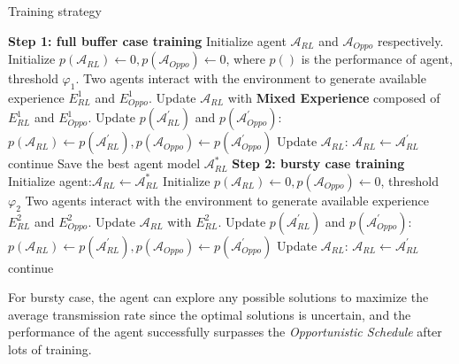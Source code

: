 \documentclass{article}
\begin{document}
\begin{algorithm}
\caption{Training strategy}
\begin{algorithmic}
\State \textbf{Step 1: full buffer case training}
\State
Initialize agent $\mathcal{A}_{RL}$ and $\mathcal{A}_{Oppo}$ respectively.
\State  
Initialize $p(\mathcal{A}_{RL}) \leftarrow 0, p(\mathcal{A}_{Oppo}) \leftarrow 0$, where $ p() $ is the performance of agent, threshold $ \varphi_{1} $.
    \State Two agents interact with the environment to generate available experience $ E_{RL}^1$ and $E_{Oppo}^1$.
    \State Update $ \mathcal{A}_{RL} $ with \textbf{Mixed Experience} composed of $ E_{RL}^1$ and $E_{Oppo}^1$.
    \EndFor
    \State Update $p(\mathcal{A}^{\prime}_{RL})$ and $p(\mathcal{A}^{\prime}_{Oppo})$:
    $
    p(\mathcal{A}_{RL}) \leftarrow p(\mathcal{A}^{\prime}_{RL}), p(\mathcal{A}_{Oppo}) \leftarrow p(\mathcal{A}^{\prime}_{Oppo})
    $
    \State Update $\mathcal{A}_{RL}$: $ \mathcal{A}_{RL} \leftarrow \mathcal{A}^{\prime}_{RL} $
    \Else
    \State continue
    \EndIf
\EndWhile
\State Save the best agent model $ \mathcal{A}^{*}_{RL} $
\State \textbf{Step 2: bursty case training}
\State
Initialize agent:$\mathcal{A}_{RL} \leftarrow \mathcal{A}^{*}_{RL}$
\State
Initialize $p(\mathcal{A}_{RL}) \leftarrow 0, p(\mathcal{A}_{Oppo}) \leftarrow 0$, threshold $ \varphi_{2} $
\State Two agents interact with the environment to generate available experience $ E_{RL}^2$ and $E_{Oppo}^2$.
\State Update $ \mathcal{A}_{RL} $ with $ E_{RL}^2$.
\State Update $p(\mathcal{A}^{\prime}_{RL})$ and $p(\mathcal{A}^{\prime}_{Oppo})$:
    $
    p(\mathcal{A}_{RL}) \leftarrow p(\mathcal{A}^{\prime}_{RL}), p(\mathcal{A}_{Oppo}) \leftarrow p(\mathcal{A}^{\prime}_{Oppo})
    $
\EndFor
{}
\State Update $\mathcal{A}_{RL}$: $ \mathcal{A}_{RL} \leftarrow \mathcal{A}^{\prime}_{RL} $
\Else
\State continue
\EndIf
\EndWhile
\end{algorithmic}
\end{algorithm}

For bursty case, the agent can explore any possible solutions to maximize the average transmission rate since the optimal solutions is uncertain, 
and the performance of the agent successfully surpasses the \textit{Opportunistic Schedule} after lots of training.
\end{document}
